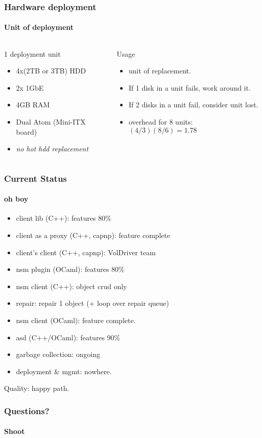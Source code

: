 \documentclass{beamer}
\begin{document}
\begin{frame}
  \frametitle{Hardware deployment}
  \framesubtitle{Unit of deployment}
  \begin{columns}[T]
    \begin{column}[T]{5cm}
      \begin{block}{1 deployment unit}
      \begin{itemize}
      \item 4x(2TB or 3TB) HDD
      \item 2x 1GbE
      \item 4GB RAM
      \item Dual Atom (Mini-ITX board)
      \item \emph{no hot hdd replacement}
      \end{itemize}
      \end{block}
    \end{column}
    \begin{column}[T]{5cm}
      \begin{block}{Usage}
        \begin{itemize}
          \item unit of replacement.
          \item If 1 disk in a unit fails, work around it.
          \item If 2 disks in a unit fail, consider unit lost.
          \item overhead for 8 units: $(4/3)(8/6)=1.78 $
        \end{itemize}
        \end{block}
    \end{column}
  \end{columns}
\end{frame}

\begin{frame}
  \frametitle{Current Status}
  \framesubtitle{oh boy}
  \begin{itemize}
    \item client lib (C++): features 80\%
    \item client as a proxy (C++, capnp): feature complete
    \item client's client (C++, capnp): VolDriver team
    \item nsm plugin (OCaml): features 80\%
    \item nsm client (C++): object crud only
    \item repair: repair 1 object (+ loop over repair queue)
    \item nsm client (OCaml): feature complete.
    \item asd (C++/OCaml): features 90\%
    \item garbage collection: ongoing
    \item deployment \& mgmt: nowhere.
  \end{itemize}
  Quality: happy path.
\end{frame}
\begin{frame}
  \frametitle{Questions?}
  \framesubtitle{Shoot}
\end{frame}
\end{document}
